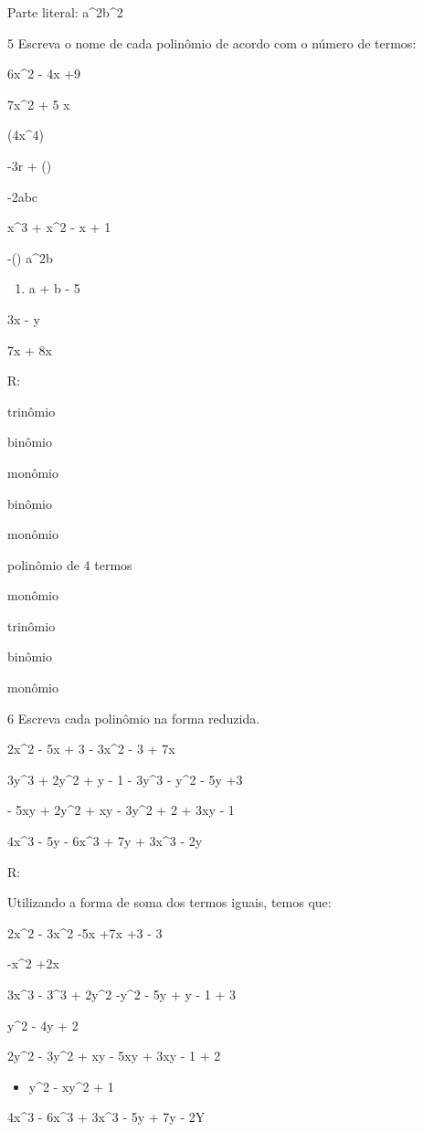 {Parte literal: a^2b^2

\num{5} Escreva o nome de cada polinômio de acordo com o número de termos:
\item 6x^2 - 4x +9
\item 7x^2 + 5 x
\item (4x^4)
\item -3r + ()
\item -2abc
\item x^3 + x^2 - x + 1
\item -() a^2b

\begin{enumerate}
\def\labelenumi{\alph{enumi})}
\setcounter{enumi}{7}
\tightlist
\item
  a + b - 5
\end{enumerate}
\item 3x - y
\item 7x + 8x

R:
\item trinômio
\item binômio
\item monômio
\item binômio
\item monômio
\item polinômio de 4 termos
\item monômio
\item trinômio
\item binômio
\item monômio

\num{6} Escreva cada polinômio na forma reduzida.
\item 2x^2 - 5x + 3 - 3x^2 - 3 + 7x
\item 3y^3 + 2y^2 + y - 1 - 3y^3 - y^2 - 5y +3
\item - 5xy + 2y^2 + xy - 3y^2 + 2 + 3xy - 1
\item 4x^3 - 5y - 6x^3 + 7y + 3x^3 - 2y

R:

Utilizando a forma de soma dos termos iguais, temos que:
\item 2x^2 - 3x^2 -5x +7x +3 - 3

-x^2 +2x
\item 3x^3 - 3^3 + 2y^2 -y^2 - 5y + y - 1 + 3

y^2 - 4y + 2
\item 2y^2 - 3y^2 + xy - 5xy + 3xy - 1 + 2

\begin{itemize}
\tightlist
\item
  y^2 - xy^2 + 1
\end{itemize}
\item 4x^3 - 6x^3 + 3x^3 - 5y + 7y - 2Y

}
